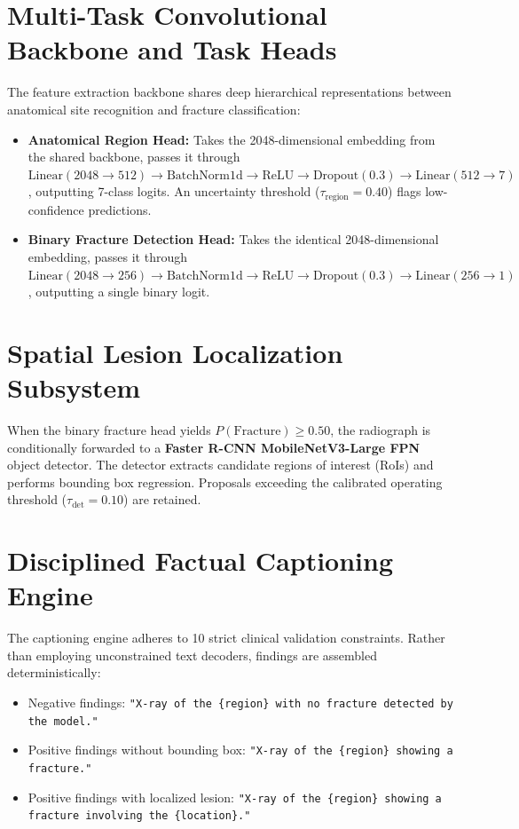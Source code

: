 \documentclass[12pt, a4paper]{report}
\begin{document}
\section{Multi-Task Convolutional Backbone and Task Heads}
The feature extraction backbone shares deep hierarchical representations between anatomical site recognition and fracture classification:
\begin{itemize}[leftmargin=*]
    \item \textbf{Anatomical Region Head:} Takes the 2048-dimensional embedding from the shared backbone, passes it through $\text{Linear}(2048 \to 512) \to \text{BatchNorm1d} \to \text{ReLU} \to \text{Dropout}(0.3) \to \text{Linear}(512 \to 7)$, outputting 7-class logits. An uncertainty threshold ($\tau_{\text{region}} = 0.40$) flags low-confidence predictions.
    \item \textbf{Binary Fracture Detection Head:} Takes the identical 2048-dimensional embedding, passes it through $\text{Linear}(2048 \to 256) \to \text{BatchNorm1d} \to \text{ReLU} \to \text{Dropout}(0.3) \to \text{Linear}(256 \to 1)$, outputting a single binary logit.
\end{itemize}

\section{Spatial Lesion Localization Subsystem}
When the binary fracture head yields $P(\text{Fracture}) \ge 0.50$, the radiograph is conditionally forwarded to a \textbf{Faster R-CNN MobileNetV3-Large FPN} object detector. The detector extracts candidate regions of interest (RoIs) and performs bounding box regression. Proposals exceeding the calibrated operating threshold ($\tau_{\text{det}} = 0.10$) are retained.

\section{Disciplined Factual Captioning Engine}
The captioning engine adheres to 10 strict clinical validation constraints. Rather than employing unconstrained text decoders, findings are assembled deterministically:
\begin{itemize}
    \item Negative findings: \texttt{"X-ray of the \{region\} with no fracture detected by the model."}
    \item Positive findings without bounding box: \texttt{"X-ray of the \{region\} showing a fracture."}
    \item Positive findings with localized lesion: \texttt{"X-ray of the \{region\} showing a fracture involving the \{location\}."}
\end{itemize}
\end{document}
